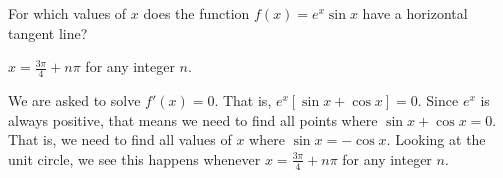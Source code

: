 \begin{question}
For which values of $x$ does the function $f(x)=e^x\sin x$ have a horizontal tangent line?
\end{question}
\begin{answer}
$x = \frac{3\pi}{4}+n\pi$ for any integer $n$.
\end{answer}
\begin{solution}
We are asked to solve $f'(x)=0$. That is, $e^x[\sin x +  \cos x]=0$. Since $e^x$ is always positive, that means we need to find all points where $\sin x + \cos x =0$. That is, we need to find all values of $x$ where $\sin x = - \cos x$. Looking at the unit circle, we see this happens whenever $x = \frac{3\pi}{4}+n\pi$ for any integer $n$.
\begin{center}
\end{center}
\end{solution}



